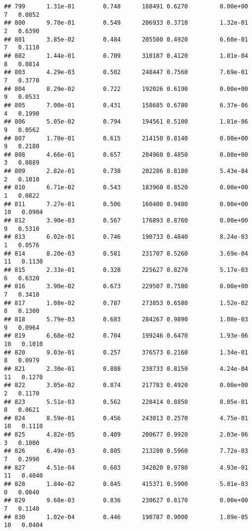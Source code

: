 \documentclass[
]{article}
\begin{document}
\begin{verbatim}
## 799      1.31e-01        0.748      188491 0.6270         0.00e+00   7   0.0852
## 800      9.70e-01        0.549      206933 0.3710         1.32e-01   2   0.6390
## 801      3.85e-02        0.484      205500 0.4920         6.60e-01   7   0.1110
## 802      1.44e-01        0.709      310187 0.4120         1.01e-04   8   0.0814
## 803      4.29e-03        0.502      248447 0.7560         7.69e-01   7   0.3770
## 804      8.29e-02        0.722      192026 0.6190         0.00e+00   9   0.0533
## 805      7.00e-01        0.431      158685 0.6780         6.37e-06   4   0.1990
## 806      5.05e-02        0.794      194561 0.5100         1.81e-06   9   0.0562
## 807      1.70e-01        0.615      214150 0.8140         0.00e+00   9   0.2180
## 808      4.66e-01        0.657      204960 0.4850         0.00e+00   3   0.0889
## 809      2.82e-01        0.738      202286 0.8180         5.43e-04   2   0.1010
## 810      6.71e-02        0.543      183960 0.8520         0.00e+00   1   0.0822
## 811      7.27e-01        0.506      160400 0.9480         0.00e+00  10   0.0904
## 812      3.90e-03        0.567      176893 0.8760         0.00e+00   9   0.5310
## 813      6.02e-01        0.746      190733 0.4840         8.24e-03   1   0.0576
## 814      8.20e-03        0.581      231707 0.5260         3.69e-04  11   0.1130
## 815      2.33e-01        0.328      225627 0.8270         5.17e-03   6   0.6320
## 816      3.90e-02        0.673      229507 0.7580         0.00e+00   7   0.3410
## 817      1.08e-02        0.787      273853 0.6580         1.52e-02   8   0.1300
## 818      5.79e-03        0.683      284267 0.9890         1.08e-03   9   0.0964
## 819      6.68e-02        0.704      199246 0.6470         1.93e-06  10   0.1010
## 820      9.03e-01        0.257      376573 0.2160         1.34e-01   8   0.0979
## 821      2.30e-01        0.888      238733 0.8150         4.24e-04  11   0.1270
## 822      3.05e-02        0.874      217783 0.4920         0.00e+00   2   0.1170
## 823      5.51e-03        0.562      228414 0.8850         8.05e-01   8   0.0621
## 824      8.59e-01        0.456      243013 0.2570         4.75e-01  10   0.1110
## 825      4.82e-05        0.409      200677 0.9920         2.03e-06   3   0.1000
## 826      6.49e-03        0.805      213280 0.5960         7.72e-03   7   0.2990
## 827      4.51e-04        0.603      342020 0.9780         4.93e-01  11   0.4040
## 828      1.84e-02        0.845      415371 0.5900         5.81e-03   0   0.0840
## 829      9.68e-03        0.836      230627 0.8170         0.00e+00   7   0.1140
## 830      1.02e-04        0.446      190787 0.9000         1.89e-05  10   0.0404

\end{verbatim}
\end{document}
